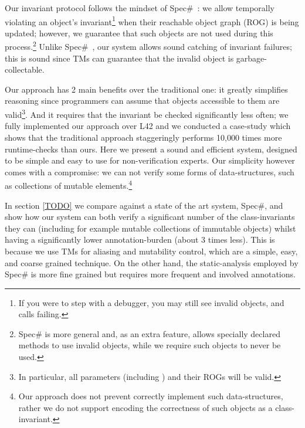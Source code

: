 Our invariant protocol follows the mindset of Spec\#~\cite{?}: we allow temporally violating an object's invariant\footnote{If you were to step with a debugger, you may still see invalid objects, and \Q@invariant@ calls failing.} when their reachable object graph (ROG) is being updated; however, we guarantee that such objects are not used during this process.\footnote{Spec\# is more general and, as an extra feature, allows specially declared methods to use invalid objects, while we require such objects to never be used.}
Unlike Spec\#~\cite{?}, our system allows sound catching of invariant failures; this is sound since TMs can guarantee that the invalid object is garbage-collectable.

Our approach has 2 main benefits over the traditional one: it greatly simplifies reasoning since programmers can assume that objects accessible to them are valid\footnote{In particular, all parameters (including \Q@this@) and their ROGs will be valid.}. And it requires that the invariant be checked significantly less often; we fully implemented our approach over L42 and we conducted a case-study which shows that the traditional approach staggeringly performs 10,000 times more runtime-checks than ours.
Here we present a sound and efficient system, designed to be simple and easy to use for non-verification experts. Our simplicity however comes with a compromise: we can not verify some forms of data-structures, such as collections of mutable elements.\footnote{Our approach does not prevent correctly implement such data-structures, rather we do not support encoding the correctness of such objects as a class-invariant.}

In section \ref{TODO} we compare against a state of the art system, Spec\#, and show how our system can both verify a significant number of the class-invariants they can (including for example mutable collections of immutable objects) whilst having a significantly lower annotation-burden (about 3 times less).
This is because we use TMs for aliasing and mutability control, which are a simple, easy, and coarse grained
technique. On the other hand, the static-analysis employed by Spec\# is more fine grained but requires more frequent and involved annotations.

